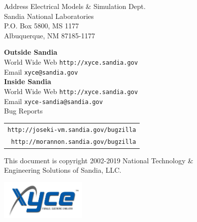 \begin{flushright}
Address \hfill Electrical Models \& Simulation Dept.\\
     Sandia National Laboratories\\
     P.O. Box 5800, MS 1177\\
     Albuquerque, NM 87185-1177 \\
\end{flushright}

\noindent
\textbf{Outside Sandia}\\
World Wide Web \hfill 
  \texttt{\color{XyceDeepRed}http://xyce.sandia.gov}
\\
Email \hfill
  \texttt{\color{XyceDeepRed}xyce@sandia.gov}
\\

\noindent
\textbf{Inside Sandia}\\
World Wide Web \hfill 
  \texttt{\color{XyceDeepRed}http://xyce.sandia.gov}
\\
Email \hfill
  \texttt{\color{XyceDeepRed}xyce-sandia@sandia.gov}
\\
Bug Reports \hfill 
\begin{tabular}{r}
  \texttt{\color{XyceDeepRed}http://joseki-vm.sandia.gov/bugzilla} \\
  \texttt{\color{XyceDeepRed}http://morannon.sandia.gov/bugzilla} 
\end{tabular}

\vfill
\noindent
\parbox{\textwidth}{
     \parbox{4.1in}{\small This document is  copyright \textcopyright{}
     2002-2019 National Technology \&\\Engineering Solutions of Sandia, LLC.}
     \hfill
     \includegraphics[height=0.75in]{xyce_flat_white}
}

